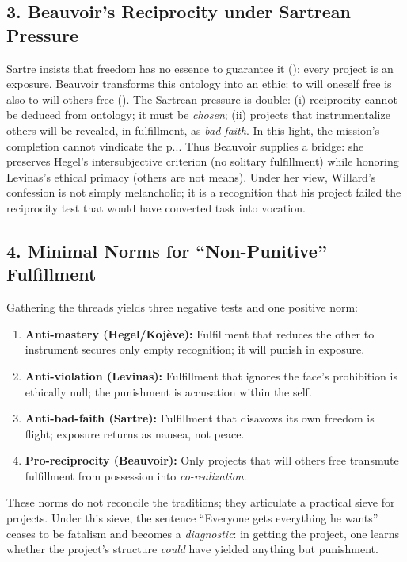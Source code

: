 \subsection*{3. Beauvoir’s Reciprocity under Sartrean Pressure}
Sartre insists that freedom has no essence to guarantee it (\parencite{SartreBN2003}); every project is an exposure. Beauvoir transforms this ontology into an ethic: to will oneself free is also to will others free (\parencite{Beauvoir1976}). The Sartrean pressure is double: (i) reciprocity cannot be deduced from ontology; it must be \emph{chosen}; (ii) projects that instrumentalize others will be revealed, in fulfillment, as \emph{bad faith}. In this light, the mission’s completion cannot vindicate the p...
Thus Beauvoir supplies a bridge: she preserves Hegel’s intersubjective criterion (no solitary fulfillment) while honoring Levinas’s ethical primacy (others are not means). Under her view, Willard’s confession is not simply melancholic; it is a recognition that his project failed the reciprocity test that would have converted task into vocation.

\subsection*{4. Minimal Norms for ``Non-Punitive'' Fulfillment}
Gathering the threads yields three negative tests and one positive norm:

\begin{enumerate}
	\item \textbf{Anti-mastery (Hegel/Koj{\`e}ve):} Fulfillment that reduces the other to instrument secures only empty recognition; it will punish in exposure.
	\item \textbf{Anti-violation (Levinas):} Fulfillment that ignores the face’s prohibition is ethically null; the punishment is accusation within the self.
	\item \textbf{Anti-bad-faith (Sartre):} Fulfillment that disavows its own freedom is flight; exposure returns as nausea, not peace.
	\item \textbf{Pro-reciprocity (Beauvoir):} Only projects that will others free transmute fulfillment from possession into \emph{co-realization}.
\end{enumerate}

These norms do not reconcile the traditions; they articulate a practical sieve for projects. Under this sieve, the sentence “Everyone gets everything he wants” ceases to be fatalism and becomes a \emph{diagnostic}: in getting the project, one learns whether the project’s structure \emph{could} have yielded anything but punishment.

